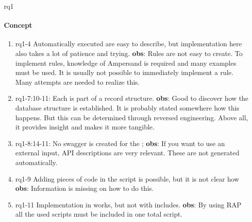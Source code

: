 \def\rq{rq1}

\acrlong{\rq}

\paragraph{Concept}
\begin{enumerate}


\end{enumerate}

\begin{enumerate}
    \item rq1-4 Automatically executed  are easy to describe, but implementation here also takes a lot of patience and trying.
    \newline\textbf{obs}: Rules are not easy to create.
    To implement rules, knowledge of Ampersand is required and many examples must be used.
    It is usually not possible to immediately implement a rule.
    Many attempts are needed to realize this.

    \item rq1-7:10-11: Each  is part of a record structure.
    \newline\textbf{obs}: Good to discover how the database structure is established.
    It is probably stated somewhere how this happens.
    But this can be determined through reversed engineering.
    Above all, it provides insight and makes it more tangible.

    \item rq1-8:14-11: No swagger is created for the ;
    \newline\textbf{obs}: If you want to use an external input, API descriptions are very relevant.
    These are not generated automatically.
    
    \item rq1-9 Adding pieces of  code in the script is possible, but it is not clear how
    \newline\textbf{obs}: Information is missing  on how to do this.
     
    \item rq1-11 Implementation in  works, but not with includes.
    \newline\textbf{obs}: By using RAP all the used scripts must be included in one total script.
     

\end{enumerate}
